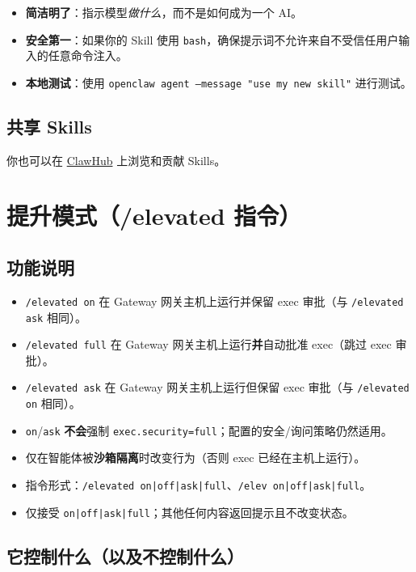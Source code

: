\begin{itemize}
  \item \textbf{简洁明了}：指示模型\textit{做什么}，而不是如何成为一个 AI。
  \item \textbf{安全第一}：如果你的 Skill 使用 \texttt{bash}，确保提示词不允许来自不受信任用户输入的任意命令注入。
  \item \textbf{本地测试}：使用 \texttt{openclaw agent --message "use my new skill"} 进行测试。
\end{itemize}


\subsection{共享 Skills}


你也可以在 \href{https://clawhub.com}{ClawHub} 上浏览和贡献 Skills。


\clearpage

\section{提升模式（/elevated 指令）}


\subsection{功能说明}


\begin{itemize}
  \item \texttt{/elevated on} 在 Gateway 网关主机上运行并保留 exec 审批（与 \texttt{/elevated ask} 相同）。
  \item \texttt{/elevated full} 在 Gateway 网关主机上运行\textbf{并}自动批准 exec（跳过 exec 审批）。
  \item \texttt{/elevated ask} 在 Gateway 网关主机上运行但保留 exec 审批（与 \texttt{/elevated on} 相同）。
  \item \texttt{on}/\texttt{ask} \textbf{不会}强制 \texttt{exec.security=full}；配置的安全/询问策略仍然适用。
  \item 仅在智能体被\textbf{沙箱隔离}时改变行为（否则 exec 已经在主机上运行）。
  \item 指令形式：\texttt{/elevated on|off|ask|full}、\texttt{/elev on|off|ask|full}。
  \item 仅接受 \texttt{on|off|ask|full}；其他任何内容返回提示且不改变状态。
\end{itemize}


\subsection{它控制什么（以及不控制什么）}


